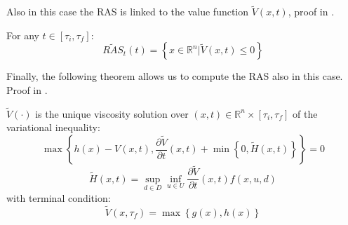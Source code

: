 Also in this case the RAS is linked to the value function $\widetilde{V}(x,t)$, proof in \cite{reach_avoid_with_dist}.
\begin{prop}
    \label{ras_v_any_time}
    For any $t \in [\tau_i, \tau_f]$: 
    \[
        \widetilde{RAS}_t(t)=
        \left\{
            x \in \mathbb{R}^n|\widetilde{V}(x,t) \leq 0
        \right\}
    \]
\end{prop}
Finally, the following theorem allows us to compute the RAS also in this case. Proof in \cite{reach_avoid_with_dist}.
\begin{theorem}
    $\widetilde{V}(\cdot)$ is the unique viscosity solution over $(x,t) \in \mathbb{R}^n \times [\tau_i, \tau_f]$ of the variational inequality:
    \[
        \max 
        \left\{
            h(x)-V(x,t), \frac{\partial \widetilde{V}}{\partial t}(x,t)+\min
            \left\{
                0, \widetilde{H}(x, t)
            \right\}
        \right\} = 0
    \]
    \[
        \widetilde{H}(x, t) = \sup_{d \in D}\inf_{u \in U} \frac{\partial \widetilde{V}}{\partial t}(x,t)f(x, u, d)
    \]
    with terminal condition:
    \[
        \widetilde{V}(x,\tau_f)=\max\left\{g(x), h(x)\right\}
    \]
\end{theorem}